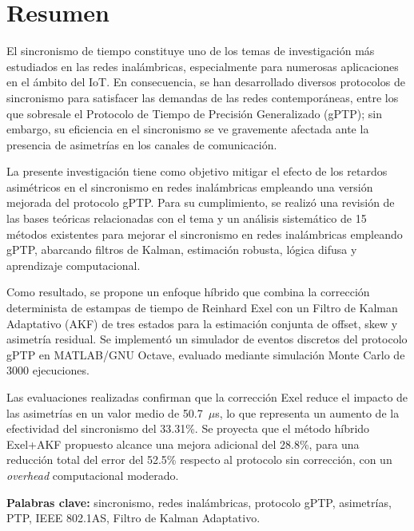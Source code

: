 
\chapter*{Resumen}

El sincronismo de tiempo constituye uno de los temas de investigación más estudiados en las redes inalámbricas, especialmente para numerosas aplicaciones en el ámbito del IoT. En consecuencia, se han desarrollado diversos protocolos de sincronismo para satisfacer las demandas de las redes contemporáneas, entre los que sobresale el Protocolo de Tiempo de Precisión Generalizado (gPTP); sin embargo, su eficiencia en el sincronismo se ve gravemente afectada ante la presencia de asimetrías en los canales de comunicación.

La presente investigación tiene como objetivo mitigar el efecto de los retardos asimétricos en el sincronismo en redes inalámbricas empleando una versión mejorada del protocolo gPTP. Para su cumplimiento, se realizó una revisión de las bases teóricas relacionadas con el tema y un análisis sistemático de 15 métodos existentes para mejorar el sincronismo en redes inalámbricas empleando gPTP, abarcando filtros de Kalman, estimación robusta, lógica difusa y aprendizaje computacional.

Como resultado, se propone un enfoque híbrido que combina la corrección determinista de estampas de tiempo de Reinhard Exel con un Filtro de Kalman Adaptativo (AKF) de tres estados para la estimación conjunta de offset, skew y asimetría residual. Se implementó un simulador de eventos discretos del protocolo gPTP en MATLAB/GNU Octave, evaluado mediante simulación Monte Carlo de 3000 ejecuciones.

Las evaluaciones realizadas confirman que la corrección Exel reduce el impacto de las asimetrías en un valor medio de 50.7~$\mu$s, lo que representa un aumento de la efectividad del sincronismo del 33.31\%. Se proyecta que el método híbrido Exel+AKF propuesto alcance una mejora adicional del 28.8\%, para una reducción total del error del 52.5\% respecto al protocolo sin corrección, con un \textit{overhead} computacional moderado.

\vspace{1cm}
\noindent\textbf{Palabras clave:} sincronismo, redes inalámbricas, protocolo gPTP, asimetrías, PTP, IEEE 802.1AS, Filtro de Kalman Adaptativo.
